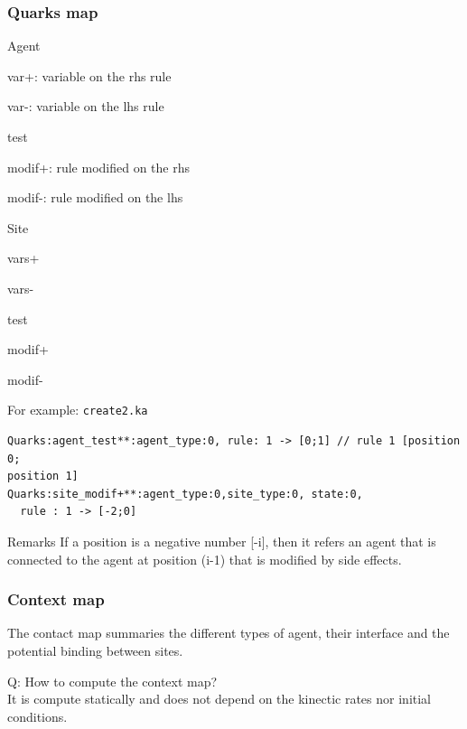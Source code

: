 \documentclass{article}
\begin{document}
\subsubsection{Quarks map}

\begin{i}
\item Agent
  \begin{i}
    \item var+: variable on the rhs rule
    \item var-: variable on the lhs rule
    \item test
    \item modif+: rule modified on the rhs
    \item modif-: rule modified on the lhs
  \end{i}

\item Site
  \begin{i}
    \item vars+
    \item vars-
    \item test
    \item modif+
    \item modif-
  \end{i}

\end{i}

For example: \verb|create2.ka|

\begin{verbatim}
Quarks:agent_test**:agent_type:0, rule: 1 -> [0;1] // rule 1 [position 0;
position 1]
Quarks:site_modif+**:agent_type:0,site_type:0, state:0,
  rule : 1 -> [-2;0]
\end{verbatim}

Remarks If a position is a negative number [-i], then it refers an agent
that is connected to the agent at position (i-1) that is modified by side
effects.
\subsubsection{Context map}

The contact map summaries the different types of agent, their interface and
the potential binding between sites.

Q: How to compute the context map?\\
It is compute statically and does not depend on the kinectic rates nor
initial conditions.
\end{document}

